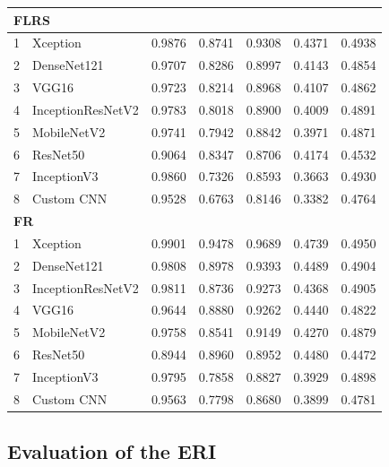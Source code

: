 \documentclass[a4paper,fleqn]{cas-dc}
\begin{document}
\begin{table}[t]
\begin{tabular}{r l *{5}{r}}
        \midrule
        \multicolumn{7}{l}{\textbf{FLRS}} \\
        \midrule
        1 & Xception          & 0.9876 & 0.8741 & 0.9308 & 0.4371 & 0.4938 \\
        2 & DenseNet121       & 0.9707 & 0.8286 & 0.8997 & 0.4143 & 0.4854 \\
        3 & VGG16             & 0.9723 & 0.8214 & 0.8968 & 0.4107 & 0.4862 \\
        4 & InceptionResNetV2 & 0.9783 & 0.8018 & 0.8900 & 0.4009 & 0.4891 \\
        5 & MobileNetV2       & 0.9741 & 0.7942 & 0.8842 & 0.3971 & 0.4871 \\
        6 & ResNet50          & 0.9064 & 0.8347 & 0.8706 & 0.4174 & 0.4532 \\
        7 & InceptionV3       & 0.9860 & 0.7326 & 0.8593 & 0.3663 & 0.4930 \\
        8 & Custom CNN        & 0.9528 & 0.6763 & 0.8146 & 0.3382 & 0.4764 \\

        \midrule
        \multicolumn{7}{l}{\textbf{FR}} \\
        \midrule
        1 & Xception          & 0.9901 & 0.9478 & 0.9689 & 0.4739 & 0.4950 \\
        2 & DenseNet121       & 0.9808 & 0.8978 & 0.9393 & 0.4489 & 0.4904 \\
        3 & InceptionResNetV2 & 0.9811 & 0.8736 & 0.9273 & 0.4368 & 0.4905 \\
        4 & VGG16             & 0.9644 & 0.8880 & 0.9262 & 0.4440 & 0.4822 \\
        5 & MobileNetV2       & 0.9758 & 0.8541 & 0.9149 & 0.4270 & 0.4879 \\
        6 & ResNet50          & 0.8944 & 0.8960 & 0.8952 & 0.4480 & 0.4472 \\
        7 & InceptionV3       & 0.9795 & 0.7858 & 0.8827 & 0.3929 & 0.4898 \\
        8 & Custom CNN        & 0.9563 & 0.7798 & 0.8680 & 0.3899 & 0.4781 \\

        \bottomrule
    \end{tabular}
\end{table}



\subsection{Evaluation of the ERI}
\end{document}
